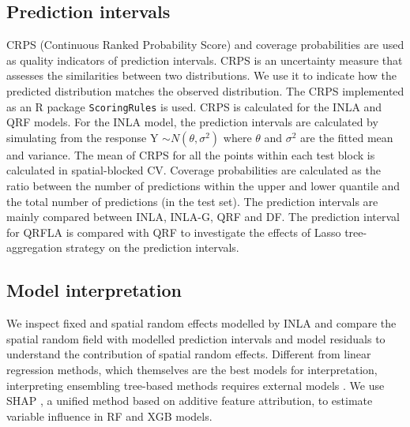 \documentclass{article}
\begin{document}
\subsection {Prediction intervals}
CRPS (Continuous Ranked Probability Score) and coverage probabilities are used as quality indicators of prediction intervals. CRPS is an uncertainty measure that assesses the similarities between two distributions.  We use it to indicate how the predicted distribution matches the observed distribution. The CRPS implemented as an R package {\tt ScoringRules} \citep{jordan2017evaluating} is used. CRPS is calculated for the INLA and QRF models. For the INLA model, the prediction intervals are calculated by simulating from the response Y $\sim N(\theta, \sigma^2)$ where $\theta$ and $\sigma^2$ are the fitted mean and variance. The mean of CRPS for all the points within each test block is calculated in spatial-blocked CV. Coverage probabilities are calculated as the ratio between the number of predictions within the upper and lower quantile and the total number of predictions (in the test set). The prediction intervals are mainly compared between INLA, INLA-G, QRF and DF. The prediction interval for QRFLA is compared with QRF to investigate the effects of Lasso tree-aggregation strategy on the prediction intervals.
 
\subsection{Model interpretation}
We inspect fixed and spatial random effects modelled by INLA and compare the spatial random field with modelled prediction intervals and model residuals to understand the contribution of spatial random effects. Different from linear regression methods, which themselves are the best models for interpretation, interpreting ensembling tree-based methods requires external models \citep{NIPS2017_8a20a862}. We use SHAP \citep[SHapley Additive exPlanations,][]{lundberg2018explainable,NIPS2017_8a20a862}, a unified method based on additive feature attribution, to estimate variable influence in RF and XGB models.   
\end{document}
